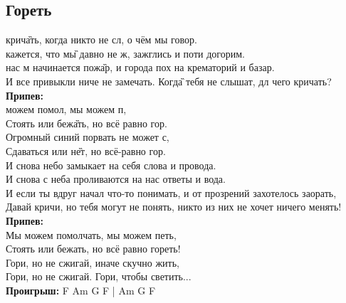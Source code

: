 \documentclass[fleqn,a5paper,12pt,twoside]{guitartabs}
\newcommand{\musVspace}{\vspace{2mm}}
\begin{document}
\subsection*{Гореть}
    \vspace{-3.0mm}
     крич\G{ать}, когда никто не сл, о чём мы говор. \\
     кажется, что м\G{ы} давно не ж, зажглись и поти догорим.\\
     нас м начинается пож\G{ар}, и города пох на крематорий и базар. \\
    И все привыкли ниче не замечать. Когд\G{а} тебя не слышат, дл чего кричать? \musVspace\\
    \-\hspace{10mm}\textbf{Припев:}\\
    \-\hspace{10mm} можем помол, мы можем п,\\
    \-\hspace{10mm}Стоять или беж\G{ать}, но всё равно гор.\\
    \-\hspace{10mm}Огромный синий  порвать не может с,\\
    \-\hspace{10mm}Сдаваться или н\G{ет}, но всё-равно гор. \musVspace\\
    И снова небо замыкает на себя слова и провода. \\
    И снова с неба проливаются на нас ответы и вода. \\
    И если ты вдруг начал что-то понимать, и от прозрений захотелось заорать, \\
    Давай кричи, но тебя могут не понять, никто из них не хочет ничего менять! \musVspace\\
    \musVspace
    \-\hspace{10mm}\textbf{Припев:}\\
    \-\hspace{10mm}Мы можем помолчать, мы можем петь, \\
    \-\hspace{10mm}Стоять или бежать, но всё равно гореть! \\
    \-\hspace{10mm}Гори, но не сжигай, иначе скучно жить, \\
    \-\hspace{10mm}Гори, но не сжигай. Гори, чтобы светить... \musVspace \\
    \textbf{Проигрыш:} F Am G F | Am G F\\
\newpage
{}%
\end{document}

